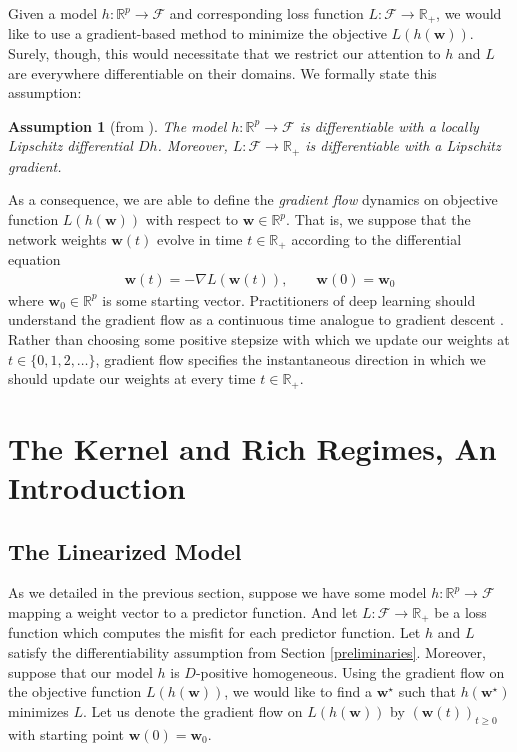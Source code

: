 \documentclass{article}
\newtheorem*{assumption}{Assumption}
\begin{document}
Given a model $h: \mathbb{R}^p \rightarrow \mathcal{F}$ and corresponding loss function $L: \mathcal{F} \rightarrow \mathbb{R}_+$, we would like to use a gradient-based method to minimize the objective $L(h(\boldsymbol{w}))$. Surely, though, this would necessitate that we restrict our attention to $h$ and $L$ are everywhere differentiable on their domains. We formally state this assumption:
\begin{assumption}[from \cite{chizat2018lazy}]\label{assumption1}
The model $h: \mathbb{R}^p \rightarrow \mathcal{F}$ is differentiable with a locally Lipschitz differential $Dh$. Moreover, $L: \mathcal{F} \rightarrow \mathbb{R}_+$ is differentiable with a Lipschitz gradient.
\end{assumption}
As a consequence, we are able to define the \textit{gradient flow} dynamics on objective function $L(h(\boldsymbol{w}))$ with respect to $\boldsymbol{w} \in \mathbb{R}^p$. That is, we suppose that the network weights $\boldsymbol{w}(t)$ evolve in time $t \in \mathbb{R}_+$ according to the differential equation
\begin{align*}
    \boldsymbol{w}(t) = -\nabla L(\boldsymbol{w}(t)), \qquad \boldsymbol{w}(0) = \boldsymbol{w}_0
\end{align*}
where $\boldsymbol{w}_0 \in \mathbb{R}^p$ is some starting vector. Practitioners of deep learning should understand the gradient flow as a continuous time analogue to gradient descent \cite{wibisono2016}. Rather than choosing some positive stepsize with which we update our weights at $t \in \{0, 1, 2, \ldots \}$, gradient flow specifies the instantaneous direction in which we should update our weights at every time $t \in \mathbb{R}_+$.

\section{The Kernel and Rich Regimes, An Introduction}\label{richkernel}

\subsection{The Linearized Model}
As we detailed in the previous section, suppose we have some model $h: \mathbb{R}^p \rightarrow \mathcal{F}$ mapping a weight vector to a predictor function. And let $L: \mathcal{F} \rightarrow \mathbb{R}_+$ be a loss function which computes the misfit for each predictor function. Let $h$ and $L$ satisfy the differentiability assumption from Section \ref{preliminaries}. Moreover, suppose that our model $h$ is $D$-positive homogeneous. Using the gradient flow on the objective function $L(h(\boldsymbol{w}))$, we would like to find a $\boldsymbol{w}^{\star}$ such that $h(\boldsymbol{w}^{\star})$ minimizes $L$. Let us denote the gradient flow on $L(h(\boldsymbol{w}))$ by $(\boldsymbol{w}(t))_{t \geq 0}$ with starting point $\boldsymbol{w}(0) = \boldsymbol{w}_0$.
\end{document}

